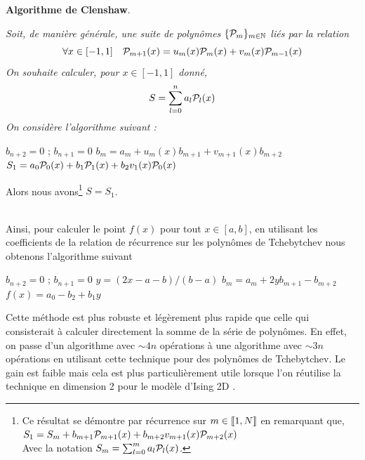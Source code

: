 \documentclass[10.5pt]{article}
\begin{document}
\begin{multicols*}{2}
\noindent
\textbf{Algorithme de Clenshaw}. {\itshape
Soit, de manière générale, une suite de polynômes $\{\mathcal{P}_m\}_{m \in \mathbb{N}}$ liés par la relation
\begin{equation}
  \forall x \in [-1, 1] \quad \mathcal{P}_{m+1}(x) = u_m(x)\mathcal{P}_m(x) + v_m(x)\mathcal{P}_{m-1}(x)
\end{equation}
On souhaite calculer, pour $x \in [-1, 1]$ donné, 
\begin{equation}
  S = \sum_{l=0}^{n} a_l \mathcal{P}_l(x)
\end{equation}
On considère l'algorithme suivant :
\vspace*{-11pt}
\begin{algorithm}[H]
  \begin{algorithmic}[1]
    \STATE $b_{n+2} = 0$ ; $b_{n+1} = 0$
    \STATE $b_m = a_m + u_m(x)b_{m+1} + v_{m+1}(x)b_{m+2}$
    \ENDFOR
    \STATE $S_1 = a_0\mathcal{P}_0(x) + b_1\mathcal{P}_1(x) + b_2v_1(x)\mathcal{P}_0(x)$
  \end{algorithmic}
\end{algorithm}
\vspace*{-11pt}
\noindent
Alors nous avons\footnote{Ce résultat se démontre par récurrence sur $m \in  \llbracket 1,N \rrbracket $ en remarquant que,
$S_1 = S_m +  b_{m+1}\mathcal{P}_{m+1}(x) + b_{m+2}v_{m+1}(x)\mathcal{P}_{m+2}(x)$\\
Avec la notation $S_m = \sum_{l=0}^{m} a_l \mathcal{P}_l(x)$.} $S = S_1$. 
} \\

Ainsi, pour calculer le point $f(x)$ pour tout $x \in [a,b]$, en utilisant les coefficients de la relation de récurrence sur les polynômes de Tchebytchev  nous obtenons l'algorithme suivant 

\begin{algorithm}[H]
  \begin{algorithmic}[1]
    \STATE $b_{n+2} = 0$ ; $b_{n+1} = 0$
    \STATE $y = (2x-a-b)/(b-a)$
    \STATE $b_m = a_m + 2yb_{m+1} - b_{m+2}$
    \ENDFOR
    \STATE $f(x) = a_0 - b_2 + b_1y$
  \end{algorithmic}
\end{algorithm}

Cette méthode \cite{clenshaw1955note} est plus robuste et légèrement plus rapide que celle qui consisterait à calculer directement la somme de la série de polynômes. En effet, on passe d'un algorithme avec $\sim 4n$ opérations à une algorithme avec $\sim 3n$ opérations en utilisant cette technique pour des polynômes de Tchebytchev. Le gain est faible mais cela est plus particulièrement utile lorsque l'on réutilise la technique en dimension 2 pour le modèle d'Ising 2D .




\end{multicols*}
\end{document}
